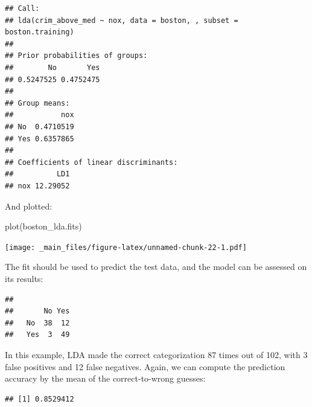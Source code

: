 \documentclass[
]{book}
\newenvironment{Shaded}{\begin{snugshade}}{\end{snugshade}}
\newcommand{\FunctionTok}[1]{\textcolor[rgb]{0.00,0.00,0.00}{#1}}
\newcommand{\NormalTok}[1]{#1}
\newcommand{\OtherTok}[1]{\textcolor[rgb]{0.56,0.35,0.01}{#1}}
\newcommand{\SpecialCharTok}[1]{\textcolor[rgb]{0.00,0.00,0.00}{#1}}
\begin{document}
\begin{verbatim}
## Call:
## lda(crim_above_med ~ nox, data = boston, , subset = boston.training)
## 
## Prior probabilities of groups:
##        No       Yes 
## 0.5247525 0.4752475 
## 
## Group means:
##           nox
## No  0.4710519
## Yes 0.6357865
## 
## Coefficients of linear discriminants:
##          LD1
## nox 12.29052
\end{verbatim}

And plotted:

\begin{Shaded}
\begin{Highlighting}[]
\FunctionTok{plot}\NormalTok{(boston\_lda.fits)}
\end{Highlighting}
\end{Shaded}

\texttt{[image: \_main\_files/figure-latex/unnamed-chunk-22-1.pdf]}

The fit should be used to predict the test data, and the model can be assessed on its results:

\begin{Shaded}
\end{Shaded}

\begin{verbatim}
##      
##       No Yes
##   No  38  12
##   Yes  3  49
\end{verbatim}

In this example, LDA made the correct categorization 87 times out of 102, with 3 false positives and 12 false negatives. Again, we can compute the prediction accuracy by the mean of the correct-to-wrong guesses:

\begin{Shaded}
\end{Shaded}

\begin{verbatim}
## [1] 0.8529412
\end{verbatim}
\end{document}
